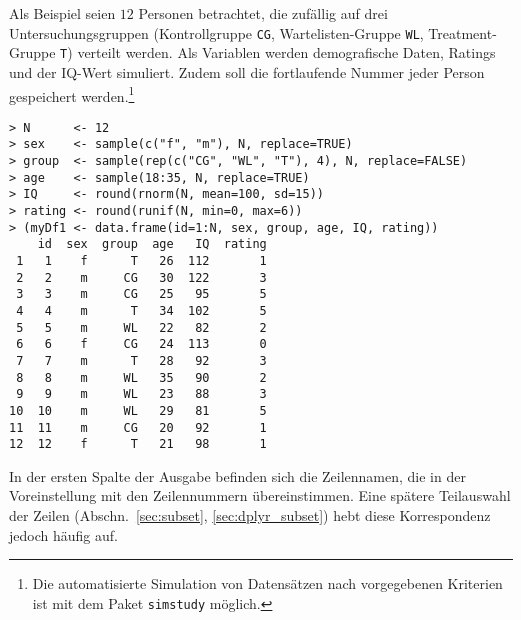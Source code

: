 Als Beispiel seien $12$ Personen betrachtet, die zufällig auf drei Untersuchungsgruppen (Kontrollgruppe \lstinline!CG!, Wartelisten-Gruppe \lstinline!WL!, Treatment-Gruppe \lstinline!T!) verteilt werden. Als Variablen werden demografische Daten, Ratings und der IQ-Wert simuliert. Zudem soll die fortlaufende Nummer jeder Person gespeichert werden.\footnote{Die automatisierte Simulation von Datensätzen nach vorgegebenen Kriterien ist mit dem Paket \lstinline!simstudy! \cite{Goldfeld2024} möglich.}
\begin{lstlisting}
> N      <- 12
> sex    <- sample(c("f", "m"), N, replace=TRUE)
> group  <- sample(rep(c("CG", "WL", "T"), 4), N, replace=FALSE)
> age    <- sample(18:35, N, replace=TRUE)
> IQ     <- round(rnorm(N, mean=100, sd=15))
> rating <- round(runif(N, min=0, max=6))
> (myDf1 <- data.frame(id=1:N, sex, group, age, IQ, rating))
    id  sex  group  age   IQ  rating
 1   1    f      T   26  112       1
 2   2    m     CG   30  122       3
 3   3    m     CG   25   95       5
 4   4    m      T   34  102       5
 5   5    m     WL   22   82       2
 6   6    f     CG   24  113       0
 7   7    m      T   28   92       3
 8   8    m     WL   35   90       2
 9   9    m     WL   23   88       3
10  10    m     WL   29   81       5
11  11    m     CG   20   92       1
12  12    f      T   21   98       1
\end{lstlisting}

In der ersten Spalte der Ausgabe befinden sich die Zeilennamen, die in der Voreinstellung mit den Zeilennummern übereinstimmen. Eine spätere Teilauswahl der Zeilen (Abschn.\ \ref{sec:subset}, \ref{sec:dplyr_subset}) hebt diese Korrespondenz jedoch häufig auf.

